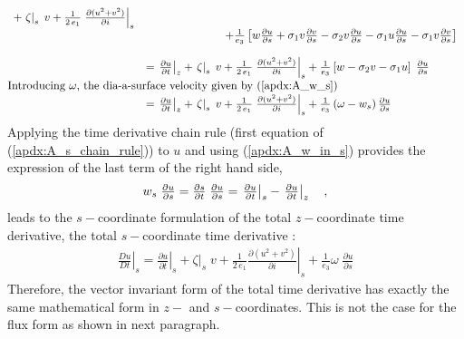 \documentclass[../main/NEMO_manual]{subfiles}
\begin{document}
\begin{subequations}
\begin{align*}
{\begin{array}{*{20}l}
        + \left. \zeta \right|_s \;v
        + \frac{1}{2\,e_1}\left. {\frac{\partial (u^2+v^2)}{\partial i}} \right|_s \\
      &\qquad \qquad \qquad \quad
        + \frac{1}{e_3} \left[    {w\frac{\partial u}{\partial s}
        +\sigma_1 v\frac{\partial v}{\partial s} - \sigma_2 v\frac{\partial u}{\partial s}
        - \sigma_1 u\frac{\partial u}{\partial s} - \sigma_1 v\frac{\partial v}{\partial s}} \right] \\ \\
      &= \left. {\frac{\partial u }{\partial t}} \right|_z
        + \left. \zeta \right|_s \;v
        + \frac{1}{2\,e_1}\left. {\frac{\partial (u^2+v^2)}{\partial i}} \right|_s
        + \frac{1}{e_3} \left[  w - \sigma_2 v - \sigma_1 u  \right]
        \; \frac{\partial u}{\partial s}   \\
      \intertext{Introducing $\omega$, the dia-a-surface velocity given by (\autoref{apdx:A_w_s}) }
      &= \left. {\frac{\partial u }{\partial t}} \right|_z
        + \left. \zeta \right|_s \;v
        + \frac{1}{2\,e_1}\left. {\frac{\partial (u^2+v^2)}{\partial i}} \right|_s
        + \frac{1}{e_3 } \left( \omega - w_s \right) \frac{\partial u}{\partial s}   \\
    \end{array}
    }
  \end{align*}
\end{subequations}
%
Applying the time derivative chain rule (first equation of (\autoref{apdx:A_s_chain_rule})) to $u$ and
using (\autoref{apdx:A_w_in_s}) provides the expression of the last term of the right hand side,
\[
  {
    \begin{array}{*{20}l}
      w_s  \;\frac{\partial u}{\partial s}
      = \frac{\partial s}{\partial t} \;  \frac{\partial u }{\partial s}
      = \left. {\frac{\partial u }{\partial t}} \right|_s  - \left. {\frac{\partial u }{\partial t}} \right|_z \quad ,
    \end{array}
  }
\]
leads to the $s-$coordinate formulation of the total $z-$coordinate time derivative,
\ie the total $s-$coordinate time derivative :
\begin{align}
  \label{apdx:A_sco_Dt_vect}
  \left. \frac{D u}{D t} \right|_s
  = \left. {\frac{\partial u }{\partial t}} \right|_s
  + \left. \zeta \right|_s \;v
  + \frac{1}{2\,e_1}\left. {\frac{\partial (u^2+v^2)}{\partial i}} \right|_s
  + \frac{1}{e_3 } \omega \;\frac{\partial u}{\partial s}
\end{align}
Therefore, the vector invariant form of the total time derivative has exactly the same mathematical form in
$z-$ and $s-$coordinates.
This is not the case for the flux form as shown in next paragraph.
\end{document}
